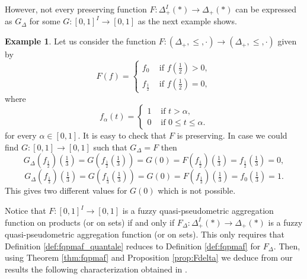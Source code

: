 \documentclass[11pt,a4paper]{amsart}
\theoremstyle{definition}
\newtheorem{example}[theorem]{Example}
\newtheorem{remark}[theorem]{Remark}
\begin{document}
	
	However, not every preserving function  $F:\Delta_+^I(\ast)\to \Delta_+(\ast)$ can be expressed as $G_\Delta$ for some $G:[0,1]^I\to [0,1]$ as the next example shows.
	
	\begin{example}
		Let us consider the function $F:(\Delta_+,\leq,\cdot)\to (\Delta_+,\leq,\cdot)$ given by
		$$F(f)=\begin{cases}
			f_0&\text{ if }f(\tfrac{1}{2})>0,\\
			f_{\tfrac{1}{2}}&\text{ if }f(\tfrac{1}{2})=0,
		\end{cases}$$
		where
		$$f_\alpha(t)=\begin{cases}
			1&\text{ if }t>\alpha,\\0&\text{ if }0\leq t\leq \alpha.\end{cases}
		$$
		for every $\alpha\in [0,1]$. It is easy to check that $F$ is preserving. In case we could find $G:[0,1]\to [0,1]$ such that $G_\Delta=F$ then 
		$$G_\Delta(f_{\tfrac{1}{2}})(\tfrac{1}{3})=G(f_{\tfrac{1}{2}}(\tfrac{1}{3}))=G(0)=F(f_{\tfrac{1}{2}})(\tfrac{1}{3})=f_{\tfrac{1}{2}}(\tfrac{1}{3})=0,$$
		$$G_\Delta(f_{\tfrac{1}{3}})(\tfrac{1}{3})=G(f_{\tfrac{1}{3}}(\tfrac{1}{3}))=G(0)=F(f_{\tfrac{1}{3}})(\tfrac{1}{3})=f_{0}(\tfrac{1}{3})=1.$$
		This gives two different values for $G(0)$ which is not possible.
		
	\end{example}
	
	
	
	
	
	
	
	
	
	
	
	
	
	
	
	
	
	
	
	Notice that $F:[0,1]^I\to [0,1]$ is a fuzzy quasi-pseudometric aggregation function on products (or on sets) if and only if $F_\Delta:\Delta_+^I(\ast)\to \Delta_+(\ast)$ is a fuzzy quasi-pseudometric aggregation function (or on sets). This only requires that Definition \ref{def:fqpmaf_quantale} reduces to Definition \ref{def:fqpmaf} for $F_\Delta.$  Then, using Theorem \ref{thm:fqpmaf} and Proposition \ref{prop:Fdelta} we deduce from our results the following characterization obtained in \cite{PRLVale21}.
	
\end{document}
